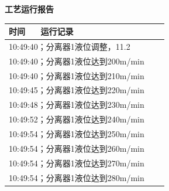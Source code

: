 \documentclass[UTF8,10pt,a4paper,fontset=fandol]{ctexart}
\newcommand{\fieldvalue}[1]{#1}
\begin{document}

\newpage

\begin{center}
\begin{minipage}[t]{0.47\linewidth}
\centering
\textbf{工艺运行报告}

\scriptsize
\begin{tabular}{|p{0.18\linewidth}|p{0.72\linewidth}|}
\hline
时间 & 运行记录\\ \hline
\multicolumn{2}{|l|}{
\fieldvalue{10:49:40；分离器1液位调整，11.2}} \\ \hline
\multicolumn{2}{|l|}{
\fieldvalue{10:49:40；分离器1液位达到200m/min}} \\ \hline
\multicolumn{2}{|l|}{
\fieldvalue{10:49:40；分离器1液位达到210m/min}} \\ \hline
\multicolumn{2}{|l|}{
\fieldvalue{10:49:45；分离器1液位达到220m/min}} \\ \hline
\multicolumn{2}{|l|}{
\fieldvalue{10:49:48；分离器1液位达到230m/min}} \\ \hline
\multicolumn{2}{|l|}{
\fieldvalue{10:49:52；分离器1液位达到240m/min}} \\ \hline
\multicolumn{2}{|l|}{
\fieldvalue{10:49:54；分离器1液位达到250m/min}} \\ \hline
\multicolumn{2}{|l|}{
\fieldvalue{10:49:54；分离器1液位达到260m/min}} \\ \hline
\multicolumn{2}{|l|}{
\fieldvalue{10:49:54；分离器1液位达到270m/min}} \\ \hline
\multicolumn{2}{|l|}{
\fieldvalue{10:49:54；分离器1液位达到280m/min}} \\ \hline

\end{tabular}
\end{minipage}
\end{center}
\end{document}
